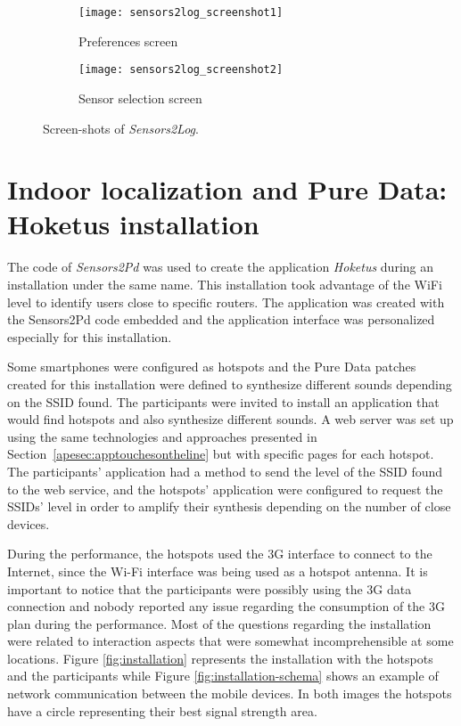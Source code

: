 \begin{figure*}[!ht]
	\centering
	\begin{subfigure}{.35\textwidth}
		\texttt{[image: sensors2log\_screenshot1]}
		\caption{Preferences screen}
		\label{fig:appsensors2log1}
	\end{subfigure}
	\begin{subfigure}{.35\textwidth}
		\texttt{[image: sensors2log\_screenshot2]}
		\caption{Sensor selection screen}
		\label{fig:appsensors2log2}
	\end{subfigure}
	
	\caption{Screen-shots of \textit{Sensors2Log}.}
	\label{fig:sensors2log}
\end{figure*}

\section{Indoor localization and Pure Data: Hoketus installation}
\label{apesec:apphoketus}

The code of \textit{Sensors2Pd} was used to create the application \textit{Hoketus} during an installation under the same name.
This installation took advantage of the WiFi level to identify users close to specific routers.
The application was created with the Sensors2Pd code embedded and the application interface was personalized especially for this installation. 

Some smartphones were configured as hotspots and the Pure Data patches created for this installation were defined to synthesize different sounds depending on the SSID found.
The participants were invited to install an application that would find hotspots and also synthesize different sounds.
A web server was set up using the same technologies and approaches presented in Section~\ref{apesec:apptouchesontheline} but with specific pages for each hotspot.
The participants' application had a method to send the level of the SSID found to the web service, and the hotspots' application were configured to request the SSIDs' level in order to amplify their synthesis depending on the number of close devices.

During the performance, the hotspots used the 3G interface to connect to the Internet, since the Wi-Fi interface was being used as a hotspot antenna. 
It is important to notice that the participants were possibly using the 3G data connection and nobody reported any issue regarding the consumption of the 3G plan during the performance.
Most of the questions regarding the installation were related to interaction aspects that were somewhat incomprehensible at some locations.
Figure \ref{fig:installation} represents the installation with the hotspots and the participants while Figure \ref{fig:installation-schema} shows an example of network communication between the mobile devices. 
In both images the hotspots have a circle representing their best signal strength area.

